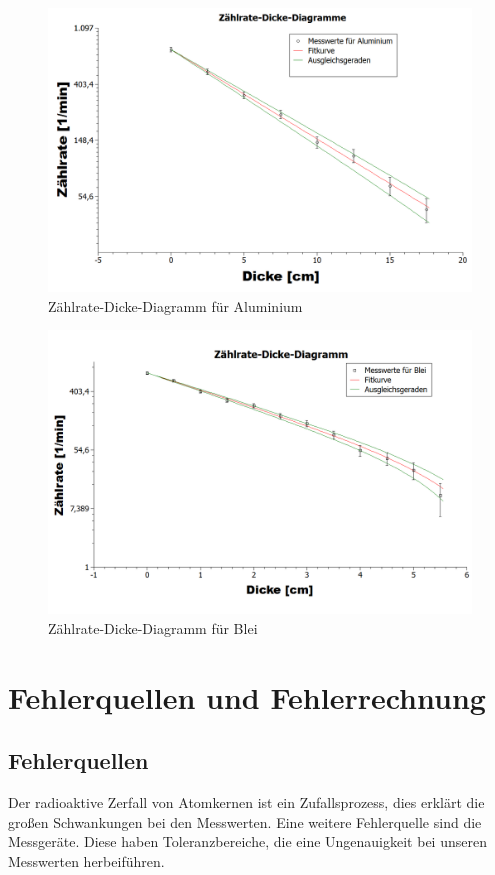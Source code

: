 \documentclass[fontsize=12pt]{scrartcl}
\begin{document}
\begin{figure}[h!]
\centering
\includegraphics[scale=0.4]{Graphik/Alu}
\caption{Zählrate-Dicke-Diagramm für Aluminium}
\end{figure}
\begin{figure}[h!]
\centering
\includegraphics[scale=0.4]{Graphik/Blei}
\caption{Zählrate-Dicke-Diagramm für Blei}
\end{figure}
\newpage
\section{Fehlerquellen und Fehlerrechnung}

\subsection{Fehlerquellen}
Der radioaktive Zerfall von Atomkernen ist ein Zufallsprozess, dies erklärt die großen Schwankungen bei den Messwerten. Eine weitere Fehlerquelle sind die Messgeräte. Diese haben Toleranzbereiche, die eine Ungenauigkeit bei unseren Messwerten herbeiführen.
\end{document}

